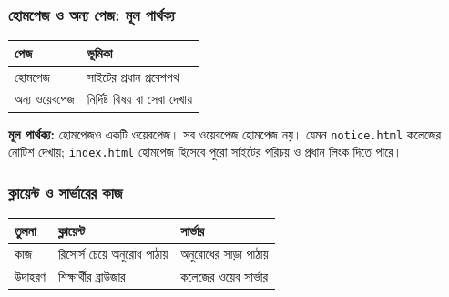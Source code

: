 \subsubsection{হোমপেজ ও অন্য পেজ: মূল পার্থক্য}
\noindent
\begin{minipage}[t]{.46\linewidth}\vspace{0pt}
\begin{tabular}{|p{.29\linewidth}|p{.59\linewidth}|}
\hline
\textbf{পেজ} & \textbf{ভূমিকা} \\
\hline
হোমপেজ & সাইটের প্রধান প্রবেশপথ \\
\hline
অন্য ওয়েবপেজ & নির্দিষ্ট বিষয় বা সেবা দেখায় \\
\hline
\end{tabular}
\end{minipage}\hfill
\begin{minipage}[t]{.50\linewidth}\vspace{0pt}
\textbf{মূল পার্থক্য:} হোমপেজও একটি ওয়েবপেজ। সব ওয়েবপেজ হোমপেজ নয়। যেমন \texttt{notice.html} কলেজের নোটিশ দেখায়; \texttt{index.html} হোমপেজ হিসেবে পুরো সাইটের পরিচয় ও প্রধান লিংক দিতে পারে।
\end{minipage}

\subsubsection{ক্লায়েন্ট ও সার্ভারের কাজ}
\begin{tabular}{|p{.22\linewidth}|p{.34\linewidth}|p{.34\linewidth}|}
\hline
\textbf{তুলনা} & \textbf{ক্লায়েন্ট} & \textbf{সার্ভার} \\
\hline
কাজ & রিসোর্স চেয়ে অনুরোধ পাঠায় & অনুরোধের সাড়া পাঠায় \\
\hline
উদাহরণ & শিক্ষার্থীর ব্রাউজার & কলেজের ওয়েব সার্ভার \\
\hline
\end{tabular}
